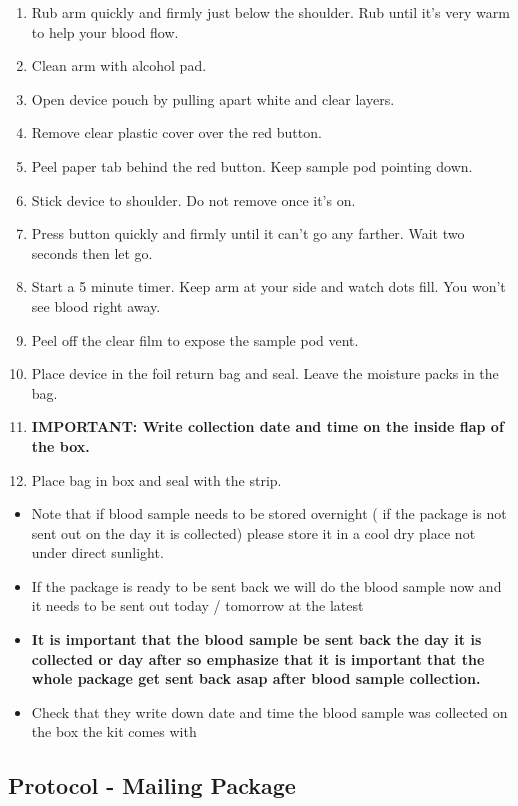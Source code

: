 \documentclass[]{book}
\begin{document}
\begin{enumerate}
\def\labelenumi{\arabic{enumi}.}
\item
  Rub arm quickly and firmly just below the shoulder. Rub until it's very warm to help your blood flow.
\item
  Clean arm with alcohol pad.
\item
  Open device pouch by pulling apart white and clear layers.
\item
  Remove clear plastic cover over the red button.
\item
  Peel paper tab behind the red button. Keep sample pod pointing down.
\item
  Stick device to shoulder. Do not remove once it's on.
\item
  Press button quickly and firmly until it can't go any farther. Wait two seconds then let go.
\item
  Start a 5 minute timer. Keep arm at your side and watch dots fill. You won't see blood right away.
\item
  Peel off the clear film to expose the sample pod vent.
\item
  Place device in the foil return bag and seal. Leave the moisture packs in the bag.
\item
  \textbf{IMPORTANT: Write collection date and time on the inside flap of the box.}
\item
  Place bag in box and seal with the strip.
\end{enumerate}

\begin{itemize}
\item
  Note that if blood sample needs to be stored overnight ( if the package is not sent out on the day it is collected) please store it in a cool dry place not under direct sunlight.
\item
  If the package is ready to be sent back we will do the blood sample now and it needs to be sent out today / tomorrow at the latest
\item
  \textbf{It is important that the blood sample be sent back the day it is collected or day after so emphasize that it is important that the whole package get sent back asap after blood sample collection.}
\item
  Check that they write down date and time the blood sample was collected on the box the kit comes with
\end{itemize}

\hypertarget{protocol---mailing-package-1}{%
\subsection{Protocol - Mailing Package}\label{protocol---mailing-package-1}}
\end{document}
